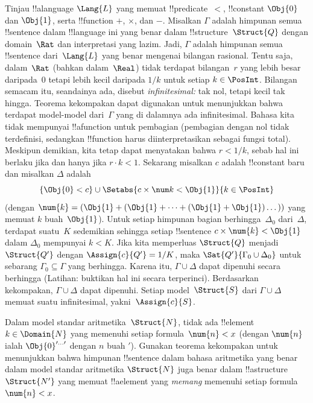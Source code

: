 \documentclass[../../../include/open-logic-section]{subfiles}
\begin{document}
{\begin{ex}
Tinjau !!a{language} $\Lang{L}$ yang memuat !!{predicate}~$<$,
!!{constant} $\Obj{0}$ dan $\Obj{1}$, serta !!{function} $+$, $\times$,
dan $-$. Misalkan $\Gamma$ adalah himpunan semua !!{sentence} dalam
!!{language} ini yang benar dalam !!{structure}~$\Struct{Q}$ dengan
domain~$\Rat$ dan interpretasi yang lazim. Jadi, $\Gamma$ adalah
himpunan semua !!{sentence} dari~$\Lang{L}$ yang benar mengenai bilangan
rasional. Tentu saja, dalam~$\Rat$ (bahkan dalam~$\Real$) tidak terdapat
bilangan~$r$ yang lebih besar daripada~$0$ tetapi lebih kecil daripada
$1/k$ untuk setiap $k \in \PosInt$. Bilangan semacam itu, seandainya
ada, disebut \emph{infinitesimal:} tak nol, tetapi kecil tak hingga.
Teorema kekompakan dapat digunakan untuk menunjukkan bahwa terdapat
model-model dari~$\Gamma$ yang di dalamnya ada infinitesimal. Bahasa kita
tidak mempunyai !!a{function} untuk pembagian (pembagian dengan nol
tidak terdefinisi, sedangkan !!{function} harus diinterpretasikan sebagai
fungsi total). Meskipun demikian, kita tetap dapat menyatakan bahwa
$r < 1/k$, sebab hal ini berlaku jika dan hanya jika $r \cdot k < 1$.
Sekarang misalkan $c$ adalah !!{constant} baru dan misalkan $\Delta$
adalah
\[
\{\Obj{0} < c\}
\cup \Setabs{ c \times \num k < \Obj{1} }{k \in \PosInt}
\]
(dengan $\num{k} = (\Obj{1} + (\Obj{1} + \dots + (\Obj{1} +
\Obj{1})\dots))$ yang memuat $k$ buah~$\Obj{1}$). Untuk setiap himpunan
bagian berhingga~$\Delta_0$ dari~$\Delta$, terdapat suatu~$K$ sedemikian
sehingga setiap !!{sentence} $c \times \num{k} < \Obj{1}$ dalam
$\Delta_0$ mempunyai $k < K$. Jika kita memperluas $\Struct{Q}$ menjadi
$\Struct{Q'}$ dengan $\Assign{c}{Q'} = 1/K$, maka
$\Sat{Q'}{\Gamma_0 \cup \Delta_0}$ untuk sebarang $\Gamma_0 \subseteq
\Gamma$ yang berhingga. Karena itu, $\Gamma \cup \Delta$ dapat dipenuhi
secara berhingga (Latihan: buktikan hal ini secara terperinci).
Berdasarkan kekompakan, $\Gamma \cup \Delta$ dapat dipenuhi. Setiap
model~$\Struct{S}$ dari $\Gamma \cup \Delta$ memuat suatu infinitesimal,
yakni~$\Assign{c}{S}$.
\end{ex}
}{}

\begin{prob}
Dalam model standar aritmetika~$\Struct{N}$, tidak ada !!{element}~$k \in
\Domain{N}$ yang memenuhi setiap formula~$\num{n} < x$ (dengan $\num{n}$
ialah $\Obj{0}^{\prime\dots\prime}$ dengan $n$ buah $\prime$). Gunakan
teorema kekompakan untuk menunjukkan bahwa himpunan !!{sentence} dalam
bahasa aritmetika yang benar dalam model standar aritmetika $\Struct{N}$
juga benar dalam !!a{structure}~$\Struct{N'}$ yang memuat !!a{element}
yang \emph{memang} memenuhi setiap formula $\num{n} < x$.
\end{prob}
\tagendprob
\end{document}
